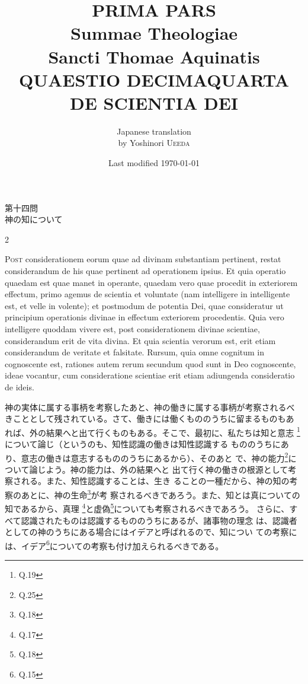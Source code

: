\documentclass[paper=a4paper,fontsize=10pt,jafontsize=9pt,titlepage]{jlreq}
\title{{\bfseries PRIMA PARS}\\{\Huge Summae Theologiae}\\Sancti Thomae
Aquinatis\\{\sffamily QUAESTIO DECIMAQUARTA}\\DE SCIENTIA DEI}
\author{Japanese translation\\by Yoshinori {\scshape Ueeda}}
\date{Last modified \today}
\begin{document}
\maketitle
\pagestyle{fancy}

\begin{center}
{\Large 第十四問\\神の知について}
\end{center}



\begin{paracol}{2}

{\huge P}{\scshape ost} considerationem eorum quae ad divinam
substantiam pertinent, restat considerandum de his quae pertinent ad
operationem ipsius. Et quia operatio quaedam est quae manet in operante,
quaedam vero quae procedit in exteriorem effectum, primo agemus de
scientia et voluntate (nam intelligere in intelligente est, et velle in
volente); et postmodum de potentia Dei, quae consideratur ut principium
operationis divinae in effectum exteriorem procedentis. Quia vero
intelligere quoddam vivere est, post considerationem divinae scientiae,
considerandum erit de vita divina. Et quia scientia verorum est, erit
etiam considerandum de veritate et falsitate. Rursum, quia omne cognitum
in cognoscente est, rationes autem rerum secundum quod sunt in Deo
cognoscente, ideae vocantur, cum consideratione scientiae erit etiam
adiungenda consideratio de ideis.

\switchcolumn

神の実体に属する事柄を考察したあと、神の働きに属する事柄が考察されるべ
きこととして残されている。さて、働きには働くもののうちに留まるものもあ
れば、外の結果へと出て行くものもある。そこで、最初に、私たちは知と意志
\footnote{Q.19}について論じ（というのも、知性認識の働きは知性認識する
もののうちにあり、意志の働きは意志するもののうちにあるから）、そのあと
で、神の能力\footnote{Q.25}について論じよう。神の能力は、外の結果へと
出て行く神の働きの根源として考察される。また、知性認識することは、生き
ることの一種だから、神の知の考察のあとに、神の生命\footnote{Q.18}が考
察されるべきであろう。また、知とは真についての知であるから、真理
\footnote{Q.17}と虚偽\footnote{Q.18}についても考察されるべきであろう。
さらに、すべて認識されたものは認識するもののうちにあるが、諸事物の理念
は、認識者としての神のうちにある場合にはイデアと呼ばれるので、知につい
ての考察には、イデア\footnote{Q.15}についての考察も付け加えられるべきである。

\end{paracol}
\end{document}
